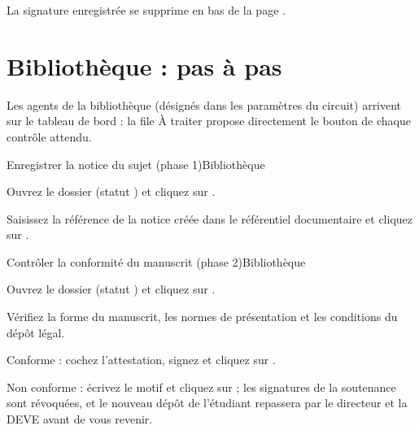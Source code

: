 \documentclass[11pt,a4paper]{article}
\begin{document}


La signature enregistrée se supprime en bas de la page .

\section{Bibliothèque : pas à pas}

Les agents de la bibliothèque (désignés dans les paramètres du circuit) arrivent sur le tableau de bord : la file
\og À traiter\fg{} propose directement le bouton de chaque contrôle attendu.

\begin{procedure}{Enregistrer la notice du sujet (phase 1)}{Bibliothèque}
\begin{etapes}
  \item Ouvrez le dossier (statut ) et
        cliquez sur .
  \item Saisissez la référence de la notice créée dans le référentiel
        documentaire et cliquez sur .
\end{etapes}
\end{procedure}


\begin{procedure}{Contrôler la conformité du manuscrit (phase 2)}{Bibliothèque}
\begin{etapes}
  \item Ouvrez le dossier (statut ) et
        cliquez sur .
  \item Vérifiez la forme du manuscrit, les normes de présentation et les
        conditions du dépôt légal.
  \item Conforme : cochez l'attestation, signez et cliquez sur
        .
  \item Non conforme : écrivez le motif et cliquez sur  ; les signatures de la soutenance sont révoquées, et le
        nouveau dépôt de l'étudiant repassera par le directeur et la DEVE avant
        de vous revenir.
\end{etapes}
\end{procedure}
\end{document}
